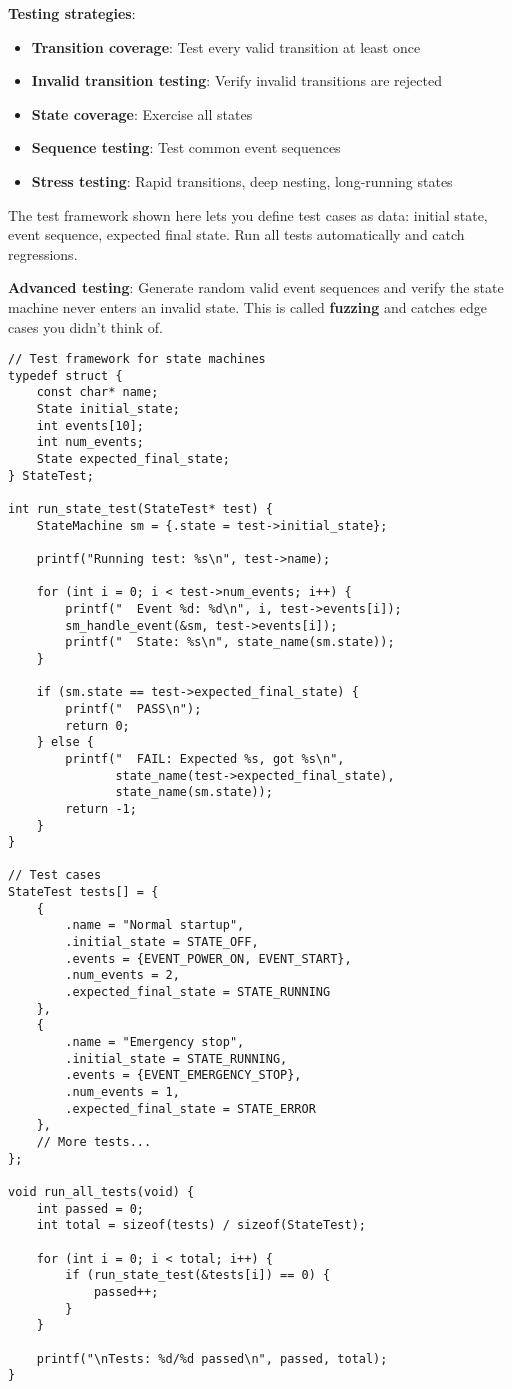 \textbf{Testing strategies}:
\begin{itemize}
    \item \textbf{Transition coverage}: Test every valid transition at least once
    \item \textbf{Invalid transition testing}: Verify invalid transitions are rejected
    \item \textbf{State coverage}: Exercise all states
    \item \textbf{Sequence testing}: Test common event sequences
    \item \textbf{Stress testing}: Rapid transitions, deep nesting, long-running states
\end{itemize}

The test framework shown here lets you define test cases as data: initial state, event sequence, expected final state. Run all tests automatically and catch regressions.

\textbf{Advanced testing}: Generate random valid event sequences and verify the state machine never enters an invalid state. This is called \textbf{fuzzing} and catches edge cases you didn't think of.

\begin{lstlisting}
// Test framework for state machines
typedef struct {
    const char* name;
    State initial_state;
    int events[10];
    int num_events;
    State expected_final_state;
} StateTest;

int run_state_test(StateTest* test) {
    StateMachine sm = {.state = test->initial_state};

    printf("Running test: %s\n", test->name);

    for (int i = 0; i < test->num_events; i++) {
        printf("  Event %d: %d\n", i, test->events[i]);
        sm_handle_event(&sm, test->events[i]);
        printf("  State: %s\n", state_name(sm.state));
    }

    if (sm.state == test->expected_final_state) {
        printf("  PASS\n");
        return 0;
    } else {
        printf("  FAIL: Expected %s, got %s\n",
               state_name(test->expected_final_state),
               state_name(sm.state));
        return -1;
    }
}

// Test cases
StateTest tests[] = {
    {
        .name = "Normal startup",
        .initial_state = STATE_OFF,
        .events = {EVENT_POWER_ON, EVENT_START},
        .num_events = 2,
        .expected_final_state = STATE_RUNNING
    },
    {
        .name = "Emergency stop",
        .initial_state = STATE_RUNNING,
        .events = {EVENT_EMERGENCY_STOP},
        .num_events = 1,
        .expected_final_state = STATE_ERROR
    },
    // More tests...
};

void run_all_tests(void) {
    int passed = 0;
    int total = sizeof(tests) / sizeof(StateTest);

    for (int i = 0; i < total; i++) {
        if (run_state_test(&tests[i]) == 0) {
            passed++;
        }
    }

    printf("\nTests: %d/%d passed\n", passed, total);
}
\end{lstlisting}

